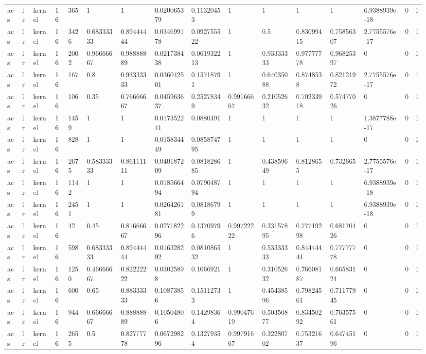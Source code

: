 \begin{tabular}{llllllllllllllll}
acs & lr & kernel & 16 & 365 & 1 & 1 & 0.020065379 & 0.11320453 & 1 & 1 & 1 & 1 & 6.9388939e-18 & 0 & 1 \\
acs & lr & kernel & 16 & 3426 & 0.68333333 & 0.89444444 & 0.034699178 & 0.092755522 & 1 & 0.5 & 0.83099415 & 0.75856307 & 2.7755576e-17 & 0 & 1 \\
acs & lr & kernel & 16 & 2002 & 0.96666667 & 0.98888889 & 0.021738438 & 0.061932213 & 1 & 0.93333333 & 0.97777778 & 0.96825397 & 0 & 0 & 1 \\
acs & lr & kernel & 16 & 167 & 0.8 & 0.93333333 & 0.036042501 & 0.15718791 & 1 & 0.64035088 & 0.8748538 & 0.82121972 & 2.7755576e-17 & 0 & 1 \\
acs & lr & kernel & 16 & 106 & 0.35 & 0.76666667 & 0.045963637 & 0.25278349 & 0.99166667 & 0.21052632 & 0.70233918 & 0.57477026 & 0 & 0 & 1 \\
acs & lr & kernel & 16 & 1459 & 1 & 1 & 0.017352241 & 0.0880491 & 1 & 1 & 1 & 1 & 1.3877788e-17 & 0 & 1 \\
acs & lr & kernel & 16 & 828 & 1 & 1 & 0.015834449 & 0.085874795 & 1 & 1 & 1 & 1 & 0 & 0 & 1 \\
acs & lr & kernel & 16 & 2675 & 0.58333333 & 0.86111111 & 0.040187209 & 0.081828685 & 1 & 0.43859649 & 0.8128655 & 0.732665 & 2.7755576e-17 & 0 & 1 \\
acs & lr & kernel & 16 & 1142 & 1 & 1 & 0.018566494 & 0.079048794 & 1 & 1 & 1 & 1 & 6.9388939e-18 & 0 & 1 \\
acs & lr & kernel & 16 & 2451 & 1 & 1 & 0.026426181 & 0.08186799 & 1 & 1 & 1 & 1 & 6.9388939e-18 & 0 & 1 \\
acs & lr & kernel & 16 & 42 & 0.45 & 0.81666667 & 0.027182296 & 0.13709796 & 0.99722222 & 0.33157895 & 0.77719298 & 0.68170426 & 0 & 0 & 1 \\
acs & lr & kernel & 16 & 598 & 0.68333333 & 0.89444444 & 0.016328292 & 0.081086532 & 1 & 0.53333333 & 0.84444444 & 0.77777778 & 0 & 0 & 1 \\
acs & lr & kernel & 16 & 1250 & 0.46666667 & 0.82222222 & 0.03025898 & 0.1066921 & 1 & 0.31052632 & 0.76608187 & 0.66583124 & 0 & 0 & 1 \\
acs & lr & kernel & 16 & 600 & 0.65 & 0.88333333 & 0.10873856 & 0.15112733 & 1 & 0.45438596 & 0.79824561 & 0.71177945 & 0 & 0 & 1 \\
acs & lr & kernel & 16 & 944 & 0.66666667 & 0.88888889 & 0.10504806 & 0.14298364 & 0.99047619 & 0.50350877 & 0.83450292 & 0.76357561 & 0 & 0 & 1 \\
acs & lr & kernel & 16 & 2655 & 0.5 & 0.82777778 & 0.067298296 & 0.13279354 & 0.99791667 & 0.32280702 & 0.75321637 & 0.64745196 & 0 & 0 & 1 \\

\end{tabular}
